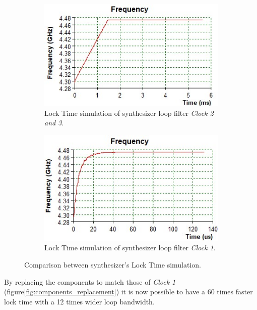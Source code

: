 \documentclass[a4paper,12pt]{article}
\begin{document}
\begin{figure}[!h]
\centering
\begin{subfigure}[b]{0.49\textwidth}
\centering
\includegraphics[width=\textwidth]{Images/time_simu_1.jpg}
\captionsetup{justification=centering}
\caption{Lock Time simulation of synthesizer loop filter \textit{Clock 2 and 3}.}
\end{subfigure}
\hfill
\begin{subfigure}[b]{0.49\textwidth}
\centering
\includegraphics[width=\textwidth]{Images/time_simu_2.jpg}
\captionsetup{justification=centering}
\caption{Lock Time simulation of synthesizer loop filter \textit{Clock 1}.}
\end{subfigure}
\caption{Comparison between synthesizer's Lock Time simulation.} 
\label{fig:time_simu}
\end{figure}

By replacing the components to match those of \textit{Clock 1} (figure\ref{fig:components_replacement}) it is now possible to have a 60 times faster lock time with a 12 times wider loop bandwidth.
\end{document}
